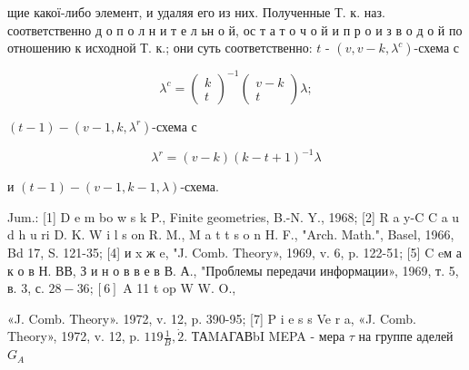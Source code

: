 \documentclass[10pt]{article}
\begin{document}
щие какої-либо элемент, и удаляя его из них. Полученные Т. к. наз. соответственно д о п о л н и т е л ьн о й, ос т а т о ч о й и п р о и з в о д о й по отношению к исходной Т. к.; они суть соответственно: $t$ - $\left(v, v-k, \lambda^{c}\right)$-схема с



\[

\lambda^{c}=\left(\begin{array}{c}

k \\

t

\end{array}\right)^{-1}\left(\begin{array}{c}

v-k \\

t

\end{array}\right) \lambda ;

\]



$(t-1)-\left(v-1, k, \lambda^{r}\right)$-схема с



\[

\lambda^{r}=(v-k)(k-t+1)^{-1} \lambda

\]



и $(t-1)-(v-1, k-1, \lambda)$-схема.



Jum.: [1] D e m bo w s k P., Finite geometries, B.-N. Y., 1968; [2] R a y-C C a u d h u ri D. K. W i l s on R. M., M a t t s o n H. F., "Arch. Math.", Basel, 1966, Bd 17, S. 121-35; [4] и x ж e, "J. Comb. Theory», 1969, v. 6, p. 122-51; [5] C eм а к о в Н. ВВ, З и н о в в е в В. А., "Проблемы передачи информации», 1969, т. 5, в. 3, с. $28-36 ;[6]$ A 11 t op W W. O.,

«J. Comb. Theory». 1972, v. 12, p. 390-95; [7] P i e s s Ve r a, «J. Comb. Theory», 1972, v. 12, p. $119 \frac{1}{B}, \dot{2}$. ТАMAГАВbI MEPA - мера $\tau$ на группе аделей $G_{A}$
\end{document}
